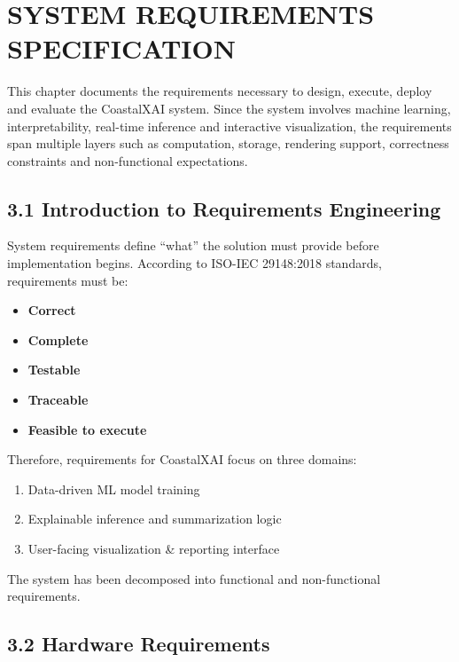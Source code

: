 \documentclass[12pt, a4paper]{article}
\begin{document}
\section{\textbf{SYSTEM REQUIREMENTS SPECIFICATION}}

This chapter documents the requirements necessary to design, execute, deploy and evaluate the CoastalXAI system. Since the system involves machine learning, interpretability, real-time inference and interactive visualization, the requirements span multiple layers such as computation, storage, rendering support, correctness constraints and non-functional expectations.

\subsection{\textbf{3.1 Introduction to Requirements Engineering}}

System requirements define “what” the solution must provide before implementation begins. According to ISO-IEC 29148:2018 standards, requirements must be:

\begin{itemize}
\item \textbf{Correct}
\item \textbf{Complete}
\item \textbf{Testable}
\item \textbf{Traceable}
\item \textbf{Feasible to execute}
\end{itemize}

Therefore, requirements for CoastalXAI focus on three domains:

\begin{enumerate}
\item Data-driven ML model training
\item Explainable inference and summarization logic
\item User-facing visualization & reporting interface
\end{enumerate}

The system has been decomposed into functional and non-functional requirements.

\subsection{\textbf{3.2 Hardware Requirements}}
\end{document}
